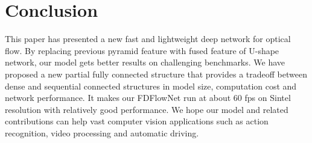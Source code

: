 \documentclass{article}
\begin{document}
\section{Conclusion}
This paper has presented a new fast and lightweight deep network for optical flow. By replacing previous pyramid feature with fused feature of U-shape network, our model gets better results on challenging benchmarks. We have proposed a new partial fully connected structure that provides a tradeoff between dense and sequential connected structures in model size, computation cost and network performance. It makes our FDFlowNet run at about 60 fps on Sintel resolution with relatively good performance. We hope our model and related contributions can help vast computer vision applications such as action recognition, video processing and automatic driving.



\end{document}
